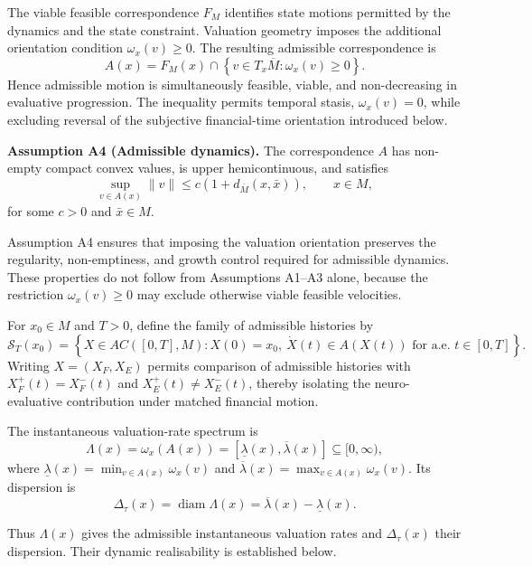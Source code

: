 \documentclass[graybox,natbib]{SNmult}
\providecommand{\1}{}
\renewcommand{\1}{\mathbbm 1}
\begin{document}
The viable feasible correspondence \(F_M\) identifies state motions permitted
by the dynamics and the state constraint. Valuation geometry imposes the
additional orientation condition
\(\omega_x(v)\geq0\). The resulting admissible correspondence is
\[
A(x)
=
F_M(x)\cap
\left\{
v\in T_x\overline M:
\omega_x(v)\geq0
\right\}.
\]
Hence admissible motion is simultaneously feasible, viable, and
non-decreasing in evaluative progression. The inequality permits temporal
stasis, \(\omega_x(v)=0\), while excluding reversal of the subjective
financial-time orientation introduced below.

\medskip

\noindent
\textbf{Assumption A4 (Admissible dynamics).}
The correspondence \(A\) has non-empty compact convex values, is upper
hemicontinuous, and satisfies
\[
\sup_{v\in A(x)}\|v\|
\leq
c\left(1+d_{\overline M}(x,\bar x)\right),
\qquad x\in M,
\]
for some \(c>0\) and \(\bar x\in M\).

Assumption A4 ensures that imposing the valuation orientation preserves the
regularity, non-emptiness, and growth control required for admissible
dynamics. These properties do not follow from Assumptions A1--A3 alone,
because the restriction \(\omega_x(v)\geq0\) may exclude otherwise viable
feasible velocities.

For \(x_0\in M\) and \(T>0\), define the family of admissible histories by
\[
\mathcal S_T(x_0)
=
\left\{
X\in AC([0,T],M):
X(0)=x_0,\ 
\dot X(t)\in A(X(t))
\text{ for a.e. }t\in[0,T]
\right\}.
\]
Writing \(X=(X_F,X_E)\) permits comparison of admissible histories with
\(X_F^+(t)=X_F^-(t)\) and \(X_E^+(t)\neq X_E^-(t)\), thereby isolating the
neuro-evaluative contribution under matched financial motion.

The instantaneous valuation-rate spectrum is
\begin{equation}
\Lambda(x)
=
\omega_x(A(x))
=
[\underline\lambda(x),\overline\lambda(x)]
\subseteq[0,\infty),
\label{eq:rate-spectrum}
\end{equation}
where
\(\underline\lambda(x)=\min_{v\in A(x)}\omega_x(v)\) and
\(\overline\lambda(x)=\max_{v\in A(x)}\omega_x(v)\). Its dispersion is
\begin{equation}
\Delta_\tau(x)
=
\operatorname{diam}\Lambda(x)
=
\overline\lambda(x)-\underline\lambda(x).
\label{eq:dispersion}
\end{equation}

Thus \(\Lambda(x)\) gives the admissible instantaneous valuation rates and
\(\Delta_\tau(x)\) their dispersion. Their dynamic realisability is established
below.
\end{document}
